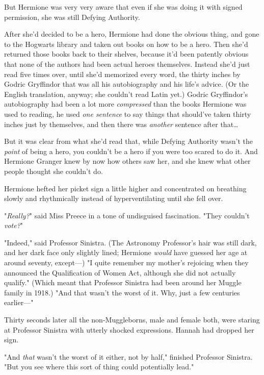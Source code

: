 But Hermione was very very aware that even if she was doing it with signed 
permission, she was still Defying Authority.

After she'd decided to be a hero, Hermione had done the obvious thing, and gone 
to the Hogwarts library and taken out books on how to be a hero. Then she'd 
returned those books back to their shelves, because it'd been patently obvious 
that none of the authors had been actual heroes themselves. Instead she'd just 
read five times over, until she'd memorized every word, the thirty inches by 
Godric Gryffindor that was all his autobiography and his life's advice. (Or the 
English translation, anyway; she couldn't read Latin yet.) Godric Gryffindor's 
autobiography had been a lot more \emph{compressed} than the books Hermione was 
used to reading, he used \emph{one sentence} to say things that should've taken 
thirty inches just by themselves, and then there was \emph{another} sentence 
after that{\ldots}

But it was clear from what she'd read that, while Defying Authority wasn't the 
\emph{point} of being a hero, you couldn't be a hero if you were too scared to 
do it. And Hermione Granger knew by now how others saw her, and she knew what 
other people thought she couldn't do.

Hermione hefted her picket sign a little higher and concentrated on breathing 
slowly and rhythmically instead of hyperventilating until she fell over.

"\emph{Really?}" said Miss Preece in a tone of undisguised fascination. "They 
couldn't \emph{vote?}"

"Indeed," said Professor Sinistra. (The Astronomy Professor's hair was still 
dark, and her dark face only slightly lined; Hermione \emph{would} have guessed 
her age at around seventy, except---) "I quite remember my mother's rejoicing 
when they announced the Qualification of Women Act, although she did not 
actually qualify." (Which meant that Professor Sinistra had been around her 
Muggle family in 1918.) "And that wasn't the worst of it. Why, just a few 
centuries earlier---"

Thirty seconds later all the non-Muggleborns, male and female both, were 
staring at Professor Sinistra with utterly shocked expressions. Hannah had 
dropped her sign.

"And \emph{that} wasn't the worst of it either, not by half," finished 
Professor Sinistra. "But you see where this sort of thing could potentially 
lead."

